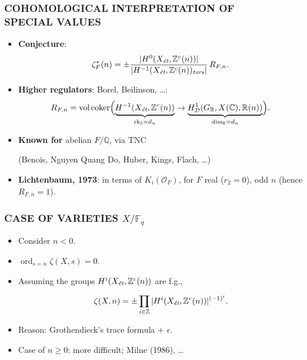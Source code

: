 \documentclass[handout]{beamer}
\newcommand{\CC}{\mathbb{C}}
\newcommand{\FF}{\mathbb{F}}
\newcommand{\QQ}{\mathbb{Q}}
\newcommand{\RR}{\mathbb{R}}
\newcommand{\ZZ}{\mathbb{Z}}
\DeclareMathOperator{\coker}{coker}
\DeclareMathOperator{\ord}{ord}
\DeclareMathOperator{\rk}{rk}
\DeclareMathOperator{\vol}{vol}
\newcommand{\et}{\text{\it ét}}
\newcommand{\tors}{\text{\it tors}}
\begin{document}

\begin{frame}
  \frametitle{COHOMOLOGICAL INTERPRETATION OF\\
    SPECIAL VALUES}

  \begin{itemize}
  \item<2-> \textbf{Conjecture}:
    \[ \zeta_F^* (n) = \pm\frac{|H^0 (X_\et, \ZZ^c (n))|}{|H^{-1} (X_\et, \ZZ^c (n))_\tors|}\,R_{F,n}. \]

  \item<3-> \textbf{Higher regulators}: Borel, Beilinson, \dots:
    \[ R_{F,n} = \vol\coker \Bigl(\underbrace{H^{-1} (X_\et, \ZZ^c(n))}_{\rk_\ZZ = d_n} \to \underbrace{H^1_\mathcal{D} (G_\RR, X(\CC), \RR(n))}_{\dim_\RR = d_n}\Bigr). \]

  \item<4-> \textbf{Known for} abelian $F/\QQ$, via TNC

    (Benois, Nguyen Quang Do, Huber, Kings, Flach, \dots)

  \item<5-> \textbf{Lichtenbaum, 1973}: in terms of
    $K_i (\mathcal{O}_F)$, for $F$ real ($r_2 = 0$), odd $n$
    (hence $R_{F,n} = 1$).
  \end{itemize}
\end{frame}


\begin{frame}
  \frametitle{CASE OF VARIETIES $X/\FF_q$}

  \begin{itemize}
  \item<2-> Consider $n < 0$.

  \item<3-> $\ord_{s = n} \zeta (X,s) = 0$.

  \item<4-> Assuming the groups $H^i (X_\et, \ZZ^c (n))$ are f.g.,

    \[ \zeta (X,n) = \pm \prod_{i\in \ZZ} |H^i (X_\et, \ZZ^c (n))|^{(-1)^i}. \]

  \item<5-> Reason: Grothendieck's trace formula + $\epsilon$.

  \item<6-> Case of $n \ge 0$: more difficult; Milne (1986), \ldots
  \end{itemize}
\end{frame}
\end{document}
